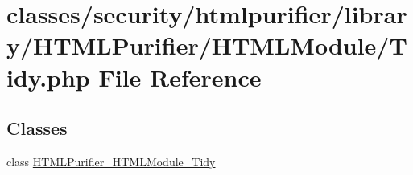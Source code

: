 \hypertarget{Tidy_8php}{\section{classes/security/htmlpurifier/library/\+H\+T\+M\+L\+Purifier/\+H\+T\+M\+L\+Module/\+Tidy.php File Reference}
\label{Tidy_8php}
}
\subsection*{Classes}
\begin{DoxyCompactItemize}
\item 
class \hyperlink{classHTMLPurifier__HTMLModule__Tidy}{H\+T\+M\+L\+Purifier\+\_\+\+H\+T\+M\+L\+Module\+\_\+\+Tidy}
\end{DoxyCompactItemize}

